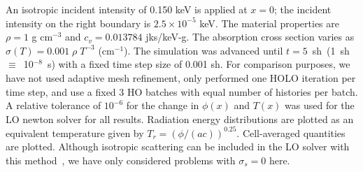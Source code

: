    An isotropic incident intensity of 0.150 keV is applied
at $x=0$; the incident intensity on the right boundary is $2.5\times10^{-5}$ keV.
The material properties are $\rho = 1$ g cm$^{-3}$ and $c_v = 0.013784$ jks/keV-g. The
absorption cross section varies as $\sigma(T) = 0.001\;\rho\; T^{-3}$ (cm$^{-1}$).
The simulation was advanced until $t=5$~sh~(1~sh~$\equiv$~10$^{-8}$~s) with a fixed time step size of 0.001 sh. For comparison purposes, we
have not used adaptive mesh
refinement, only performed one HOLO iteration per time
step, and use a fixed 3 HO batches with equal number of histories per batch. A
relative tolerance of $10^{-6}$ for the change in $\phi(x)$ and $T(x)$ was used for
the LO newton solver for all results. Radiation energy
distributions are plotted as an equivalent temperature given by
$T_r=(\phi/(ac))^{0.25}$.  Cell-averaged quantities are plotted.
Although isotropic scattering can be included in the LO solver with this method~\cite{ans_2014}, we have only
considered problems with $\sigma_s = 0$ here.  
